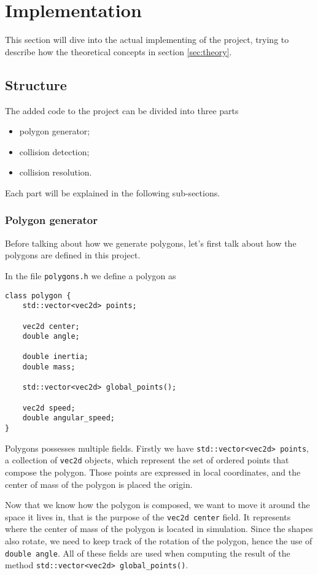 \section{Implementation}

This section will dive into the actual implementing of the project, trying to
describe how the theoretical concepts in section \ref{sec:theory}.

\subsection{Structure}

The added code to the project can be divided into three parts
\begin{itemize}
	\item polygon generator;
	\item collision detection;
	\item collision resolution.
\end{itemize}

Each part will be explained in the following sub-sections.

\subsubsection{Polygon generator}
Before talking about how we generate polygons, let's first talk about how the
polygons are defined in this project.

In the file \texttt{polygons.h} we define a polygon as

\begin{lstlisting}[caption={Polygon class (simplified)},label={lst:polygon}]
class polygon {
    std::vector<vec2d> points;

    vec2d center;
    double angle;

    double inertia;
    double mass;

    std::vector<vec2d> global_points();

    vec2d speed;
    double angular_speed;
}
\end{lstlisting}

Polygons possesses multiple fields. Firstly we have
\lstinline{std::vector<vec2d> points}, a collection of
\lstinline{vec2d} objects, which represent the set of ordered points that
compose the polygon. Those points are expressed in local coordinates, and the
center of mass of the polygon is placed the origin.

Now that we know how the polygon is composed, we want to move it around the
space it lives in, that is the purpose of the \lstinline{vec2d center} field.
It represents where the center of mass of the polygon is located in simulation.
Since the shapes also rotate, we need to keep track of the rotation of the
polygon, hence the use of \lstinline{double angle}. All of these fields are used
when computing the result of the method \lstinline{std::vector<vec2d> global_points()}.

